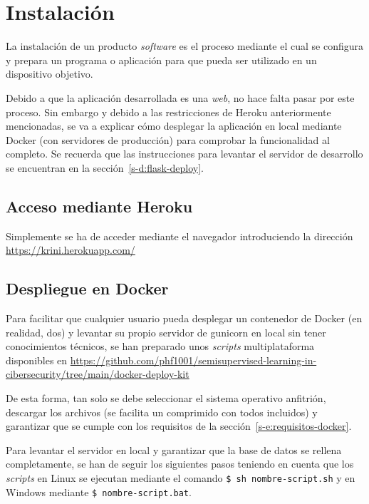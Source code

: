 \section{Instalación}

La instalación de un producto \textit{software} es el proceso mediante el cual se configura y prepara un programa o aplicación para que pueda ser utilizado en un dispositivo objetivo.

Debido a que la aplicación desarrollada es una \textit{web}, no hace falta pasar por este proceso. Sin embargo y debido a las restricciones de Heroku anteriormente mencionadas, se va a explicar cómo desplegar la aplicación en local mediante Docker (con servidores de producción) para comprobar la funcionalidad al completo. Se recuerda que las instrucciones para levantar el servidor de desarrollo se encuentran en la sección~\ref{s-d:flask-deploy}.

\subsection{Acceso mediante Heroku}

Simplemente se ha de acceder mediante el navegador introduciendo la dirección \url{https://krini.herokuapp.com/}

\subsection{Despliegue en Docker}
\label{s-e:docker-deploy-users}

Para facilitar que cualquier usuario pueda desplegar un contenedor de Docker (en realidad, dos) y levantar su propio servidor de gunicorn en local sin tener conocimientos técnicos, se han preparado unos \textit{scripts} multiplataforma disponibles en \url{https://github.com/phf1001/semisupervised-learning-in-cibersecurity/tree/main/docker-deploy-kit}

De esta forma, tan solo se debe seleccionar el sistema operativo anfitrión, descargar los archivos (se facilita un comprimido con todos incluidos) y garantizar que se cumple con los requisitos de la sección~\ref{s-e:requisitos-docker}.

Para levantar el servidor en local y garantizar que la base de datos se rellena completamente, se han de seguir los siguientes pasos teniendo en cuenta que los \textit{scripts} en Linux se ejecutan mediante el comando \texttt{\$ sh nombre-script.sh} y en Windows mediante \texttt{\$ nombre-script.bat}.

